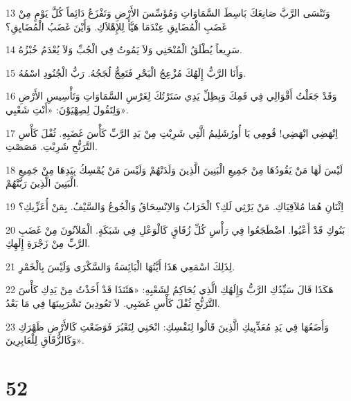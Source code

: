 \par 13 وَتَنْسَى الرَّبَّ صَانِعَكَ بَاسِطَ السَّمَاوَاتِ وَمُؤَسِّسَ الأَرْضِ وَتَفْزَعُ دَائِماً كُلَّ يَوْمٍ مِنْ غَضَبِ الْمُضَايِقِ عِنْدَمَا هَيَّأَ لِلإِهْلاَكِ. وَأَيْنَ غَضَبُ الْمُضَايِقِ؟
\par 14 سَرِيعاً يُطْلَقُ الْمُنْحَنِي وَلاَ يَمُوتُ فِي الْجُبِّ وَلاَ يُعْدَمُ خُبْزُهُ.
\par 15 وَأَنَا الرَّبُّ إِلَهُكَ مُزْعِجُ الْبَحْرِ فَتَعِجُّ لُجَجُهُ. رَبُّ الْجُنُودِ اسْمُهُ.
\par 16 وَقَدْ جَعَلْتُ أَقْوَالِي فِي فَمِكَ وَبِظِلِّ يَدِي سَتَرْتُكَ لِغَرْسِ السَّمَاوَاتِ وَتَأْسِيسِ الأَرْضِ وَلِتَقُولَ لِصِهْيَوْنَ: «أَنْتِ شَعْبِي».
\par 17 اِنْهَضِي انْهَضِي! قُومِي يَا أُورُشَلِيمُ الَّتِي شَرِبْتِ مِنْ يَدِ الرَّبِّ كَأْسَ غَضَبِهِ. ثُفْلَ كَأْسِ التَّرَنُّحِ شَرِبْتِ. مَصَصْتِ.
\par 18 لَيْسَ لَهَا مَنْ يَقُودُهَا مِنْ جَمِيعِ الْبَنِينَ الَّذِينَ وَلَدَتْهُمْ وَلَيْسَ مَنْ يُمْسِكُ بِيَدِهَا مِنْ جَمِيعِ الْبَنِينَ الَّذِينَ رَبَّتْهُمْ.
\par 19 اِثْنَانِ هُمَا مُلاَقِيَاكِ. مَنْ يَرْثِي لَكِ؟ الْخَرَابُ وَالاِنْسِحَاقُ وَالْجُوعُ وَالسَّيْفُ. بِمَنْ أُعَزِّيكِ؟
\par 20 بَنُوكِ قَدْ أَعْيُوا. اضْطَجَعُوا فِي رَأْسِ كُلِّ زُقَاقٍ كَالْوَعْلِ فِي شَبَكَةٍ. الْمَلآنُونَ مِنْ غَضَبِ الرَّبِّ مِنْ زَجْرَةِ إِلَهِكِ.
\par 21 لِذَلِكَ اسْمَعِي هَذَا أَيَّتُهَا الْبَائِسَةُ وَالسَّكْرَى وَلَيْسَ بِالْخَمْرِ.
\par 22 هَكَذَا قَالَ سَيِّدُكِ الرَّبُّ وَإِلَهُكِ الَّذِي يُحَاكِمُ لِشَعْبِهِ: «هَئَنَذَا قَدْ أَخَذْتُ مِنْ يَدِكِ كَأْسَ التَّرَنُّحِ ثُفْلَ كَأْسِ غَضَبِي. لاَ تَعُودِينَ تَشْرَبِينَهَا فِي مَا بَعْدُ.
\par 23 وَأَضَعُهَا فِي يَدِ مُعَذِّبِيكِ الَّذِينَ قَالُوا لِنَفْسِكِ: انْحَنِي لِنَعْبُرَ فَوَضَعْتِ كَالأَرْضِ ظَهْرَكِ وَكَالزُّقَاقِ لِلْعَابِرِينَ».

\chapter{52}

